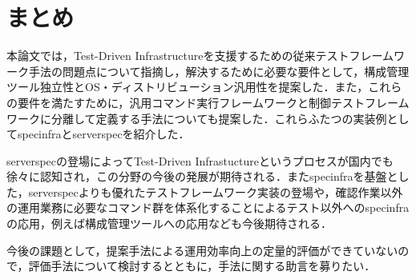 \section{まとめ}

本論文では，Test-Driven Infrastructureを支援するための従来テストフレームワーク手法の問題点について指摘し，解決するために必要な要件として，構成管理ツール独立性とOS・ディストリビューション汎用性を提案した．また，これらの要件を満たすために，汎用コマンド実行フレームワークと制御テストフレームワークに分離して定義する手法についても提案した．これらふたつの実装例としてspecinfraとserverspecを紹介した．

serverspecの登場によってTest-Driven Infrastuctureというプロセスが国内でも徐々に認知され，この分野の今後の発展が期待される．またspecinfraを基盤とした，serverspecよりも優れたテストフレームワーク実装の登場や，確認作業以外の運用業務に必要なコマンド群を体系化することによるテスト以外へのspecinfraの応用，例えば構成管理ツールへの応用なども今後期待される．

今後の課題として，提案手法による運用効率向上の定量的評価ができていないので，評価手法について検討するとともに，手法に関する助言を募りたい．

